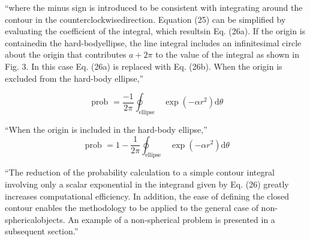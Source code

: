 ``where the minus sign is introduced to be consistent with integrating around the contour in the counterclockwisedirection. Equation (25) can be simplified by evaluating the coefficient of the integral, which resultsin Eq. (26a). If the origin is containedin the hard-bodyellipse, the line integral includes an infinitesimal circle about the origin that contributes $a+2 \pi$ to the value of the integral as shown in Fig. 3. In this case Eq. (26a) is replaced with Eq. (26b). When the origin is excluded from the hard-body ellipse,''

\begin{equation}
    \text { prob }=\frac{-1}{2 \pi} \oint_{\text {ellipse }} \exp \left(-\alpha r^{2}\right) \mathrm{d} \theta
\end{equation}

``When the origin is included in the hard-body ellipse,''
\begin{equation}
    \text { prob }=1-\frac{1}{2 \pi} \oint_{\text {ellipse }} \exp \left(-\alpha r^{2}\right) \mathrm{d} \theta
\end{equation}

``The reduction of the probability calculation to a simple contour integral involving only a scalar exponential in the integrand given by Eq. (26) greatly increases computational efficiency. In addition, the ease of defining the closed contour enables the methodology to be applied to the general case of non-sphericalobjects. An example of a non-spherical problem is presented in a subsequent section.''



